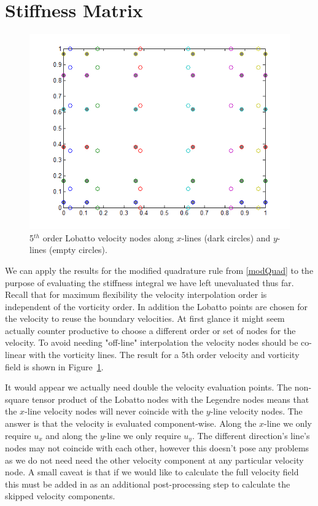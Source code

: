 \documentclass[letterpaper,12pt]{report}
\begin{document}
%
\section{Stiffness Matrix}\label{StiffM}

\begin{figure}
\centering
\includegraphics[width=5.5in]{VelocityLobatto.PNG}
\caption{\label{fig:VelocityLobatto}5$^{th}$ order Lobatto velocity nodes along $x$-lines (dark circles) and $y$-lines (empty circles).}
\end{figure}

We can apply the results for the modified quadrature rule from \eqref{modQuad} to the purpose of evaluating the stiffness integral we have left unevaluated thus far. Recall that for maximum flexibility the velocity interpolation order is independent of the vorticity order. In addition the Lobatto points are chosen for the velocity to reuse the boundary velocities. At first glance it might seem actually counter productive to choose a different order or set of nodes for the velocity. To avoid needing "off-line" interpolation the velocity nodes should be co-linear with the vorticity lines. The result for a 5th order velocity and vorticity field is shown in Figure~\ref{fig:VelocityLobatto}.

It would appear we actually need double the velocity evaluation points. The non-square tensor product of the Lobatto nodes with the Legendre nodes means that the $x$-line velocity nodes will never coincide with the $y$-line velocity nodes. The answer is that the velocity is evaluated component-wise. Along the $x$-line we only require $u_x$ and along the $y$-line we only require $u_y$. The different direction's line's nodes may not coincide with each other, however this doesn't pose any problems as we do not need need the other velocity component at any particular velocity node. A small caveat is that if we would like to calculate the full velocity field this must be added in as an additional post-processing step to calculate the skipped velocity components.
\end{document}
